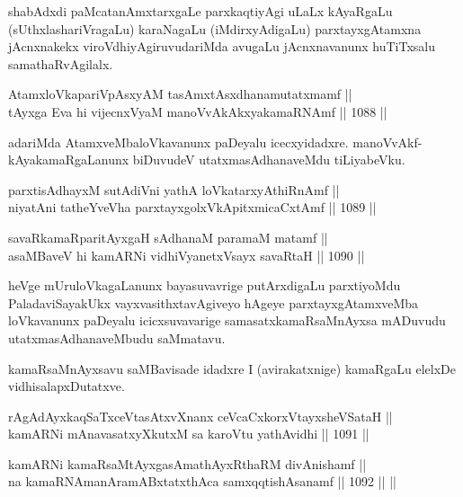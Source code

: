 \begin{artha}
shabAdxdi paMcatanAmxtarxgaLe parxkaqtiyAgi uLaLx kAyaRgaLu (sUthxlashariVragaLu) karaNagaLu (iMdirxyAdigaLu) parxtayxgAtamxna jAcnxnakekx viroVdhiyAgiruvudariMda avugaLu jAcnxnavanunx huTiTxsalu samathaRvAgilalx.
\end{artha}

\begin{shl}
AtamxloVkapariVpAsxyAM tasAmxtAsxdhanamutatxmamf || \\
tAyxga Eva hi vijecnxVyaM manoVvAkAkxyakamaRNAmf ||  1088 ||  
\end{shl}

\begin{artha}
adariMda AtamxveMbaloVkavanunx paDeyalu icecxyidadxre. manoVvAkf-kAyakamaRgaLanunx biDuvudeV utatxmasAdhanaveMdu tiLiyabeVku.
\end{artha}

\begin{shl}
parxtisAdhayxM sutAdiVni yathA loVkatarxyAthiRnAmf || \\
niyatAni tatheYveVha parxtayxgolxVkApitxmicaCxtAmf ||  1089 ||  
\end{shl}
				
\begin{shl}
savaRkamaRparitAyxgaH sAdhanaM paramaM matamf || \\
asaMBaveV hi kamARNi vidhiVyanetxV\s sayx savaRtaH ||  1090 ||  
\end{shl}

\begin{artha}
heVge mUruloVkagaLanunx bayasuvavrige putArxdigaLu parxtiyoMdu PaladaviSayakUkx vayxvasithxtavAgiveyo hAgeye parxtayxgAtamxveMba loVkavanunx paDeyalu icicxsuvavarige samasatxkamaRsaMnAyxsa mADuvudu utatxmasAdhanaveMbudu saMmatavu.
\end{artha}

\begin{artha}
kamaRsaMnAyxsavu saMBavisade idadxre I (avirakatxnige) kamaRgaLu elelxDe vidhisalapxDutatxve.
\end{artha}

\begin{shl}
rAgAdAyxkaqSaTxceVtasAtxvXnanx ceVcaCxkorxVtayxsheVSataH || \\
kamARNi mAnavasatxyXkutxM sa karoVtu yathAvidhi ||  1091 ||  
\end{shl}
				
\begin{shl}
kamARNi kamaRsaMtAyxgasAmathAyxRthaRM divAnishamf ||  \\
na kamaRNAmanAramABxtatxthAca samxqqtishAsanamf ||  1092 ||  ||  
\end{shl}

